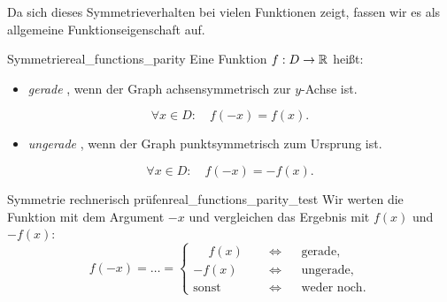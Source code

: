 \par\medskip\noindent
Da sich dieses Symmetrieverhalten bei vielen Funktionen zeigt, fassen wir es
als allgemeine Funktionseigenschaft auf.
\begin{FunctionPropertyBox}{Symmetrie}{real_functions_parity}
  Eine Funktion $f:D\to\mathbb{R}$ heißt:\par\smallskip\noindent
  \begin{minipage}[t]{0.46\linewidth}
    \vspace{0pt}
    \begin{itemize}[leftmargin=*]
      \item \emph{gerade} , wenn der Graph
        achsensymmetrisch zur $y$-Achse ist.
    \end{itemize}
    \[
      \forall x\in D:\quad f(-x)=f(x).
    \]\par\noindent
    \centering
  \end{minipage}\hspace{0.08\linewidth}%
  \begin{minipage}[t]{0.46\linewidth}
    \vspace{0pt}
    \begin{itemize}[leftmargin=*]
      \item \emph{ungerade} , wenn der Graph
        punktsymmetrisch zum Ursprung ist.
    \end{itemize}
    \[
      \forall x\in D:\quad f(-x)=-f(x).
    \]\par\noindent
    \centering
  \end{minipage}
\end{FunctionPropertyBox}
\begin{KeyPointBox}{Symmetrie rechnerisch prüfen}{real_functions_parity_test}
  Wir werten die Funktion mit dem Argument $-x$ und vergleichen das Ergebnis mit $f(x)$ und $-f(x)$:
  \[
    f(-x)=\dots=\begin{cases}
      \phantom{+} f(x) &\quad \Longleftrightarrow \quad \text{ gerade},\\
      - f(x)&\quad \Longleftrightarrow \quad \text{ ungerade},\\
      \text{sonst}&\quad \Longleftrightarrow \quad \text{ weder noch}.
    \end{cases}
  \]
\end{KeyPointBox}
